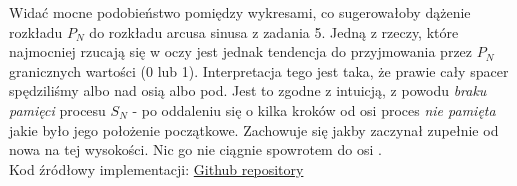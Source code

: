 \documentclass{article}
\begin{document}
Widać mocne podobieństwo pomiędzy wykresami, co sugerowałoby dążenie rozkładu \( P_N \) do rozkładu arcusa sinusa z zadania 5.
Jedną z rzeczy, które najmocniej rzucają się w oczy jest jednak tendencja do przyjmowania przez \( P_N \) granicznych wartości (0 lub 1).
Interpretacja tego jest taka, że prawie cały spacer spędziliśmy albo nad osią  albo pod.
Jest to zgodne z intuicją, z powodu \textit{braku pamięci} procesu \( S_N \) - po oddaleniu się o kilka kroków od osi  
proces \textit{nie pamięta} jakie było jego położenie początkowe. Zachowuje się jakby zaczynał zupełnie od nowa na tej wysokości.
Nic go nie ciągnie spowrotem do osi .\\


Kod źródłowy implementacji: \href{https://github.com/nskowron/Statistics2024/tree/main/Exc4}{Github repository}
\end{document}

